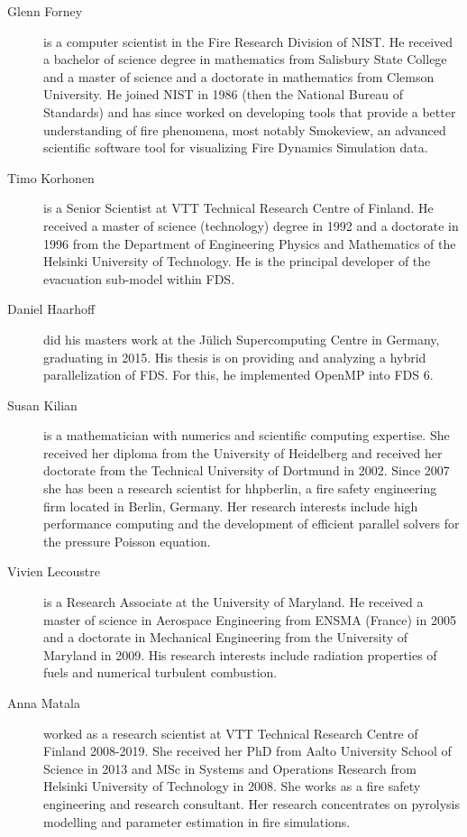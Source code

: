 \begin{description}
\item[Glenn Forney] is a computer scientist in the Fire Research Division of NIST.  He received a bachelor of science degree in mathematics from Salisbury State College and a master of science and a doctorate in mathematics from Clemson University.  He joined NIST in 1986 (then the National Bureau of Standards) and has since worked on developing tools that provide a better understanding of fire phenomena, most notably Smokeview, an advanced scientific software tool for visualizing Fire Dynamics Simulation data.

\item[Timo Korhonen] is a Senior Scientist at VTT Technical Research Centre of Finland. He received a master of science (technology) degree in 1992 and a doctorate in 1996 from the Department of Engineering Physics and Mathematics of the Helsinki University of Technology. He is the principal developer of the evacuation sub-model within FDS.

\item[Daniel Haarhoff] did his masters work at the J\"ulich Supercomputing Centre in Germany, graduating in 2015. His thesis is on providing and analyzing a hybrid parallelization of FDS. For this, he implemented OpenMP into FDS 6.

\item[Susan Kilian] is a mathematician with numerics and scientific computing expertise. She received her diploma from the University of Heidelberg and received her doctorate from the Technical University of Dortmund in 2002. Since 2007 she has been a research scientist for hhpberlin, a fire safety engineering firm located in Berlin, Germany. Her research interests include high performance computing and the development of efficient parallel solvers for the pressure Poisson equation.

\item[Vivien Lecoustre] is a Research Associate at the University of Maryland. He received a master of science in Aerospace Engineering from ENSMA (France) in 2005 and a doctorate in Mechanical Engineering from the University of Maryland in 2009. His research interests include radiation properties of fuels and numerical turbulent combustion.

\item[Anna Matala] worked as a research scientist at VTT Technical Research Centre of Finland 2008-2019. She received her PhD from Aalto University School of Science in 2013 and MSc in Systems and Operations Research from Helsinki University of Technology in 2008. She works as a fire safety engineering and research consultant. Her research concentrates on pyrolysis modelling and parameter estimation in fire simulations.


\end{description}
